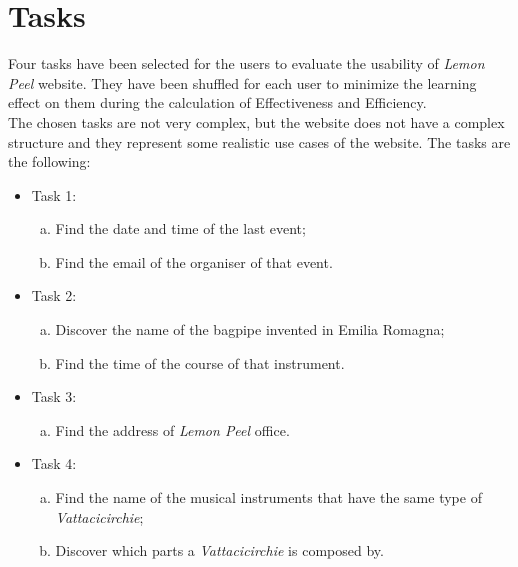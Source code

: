 \documentclass[../../UsabilityReport.tex]{subfiles}
\begin{document}
\section{Tasks}
	Four tasks have been selected for the users to evaluate the usability of \textit{Lemon Peel} website. They have been shuffled for each user to minimize the learning effect on them during the calculation of Effectiveness and Efficiency.\\
	The chosen tasks are not very complex, but the website does not have a complex structure and they represent some realistic use cases of the website. The tasks are the following:
	\begin{itemize}
		\item Task 1:
			\begin{enumerate}[(a)]
				\item Find the date and time of the last event;
				\item Find the email of the organiser of that event.
			\end{enumerate}
		\item Task 2:
			\begin{enumerate}[(a)]
				\item Discover the name of the bagpipe invented in Emilia Romagna;
				\item Find the time of the course of that instrument.
			\end{enumerate}	
		\item Task 3:
			\begin{enumerate}[(a)]
				\item Find the address of \textit{Lemon Peel} office.
			\end{enumerate}
		\item Task 4:
			\begin{enumerate}[(a)]
				\item Find the name of the musical instruments that have the same type of \textit{Vattacicirchie};
				\item Discover which parts a \textit{Vattacicirchie} is composed by.
			\end{enumerate}
		\end{itemize}
\end{document}
